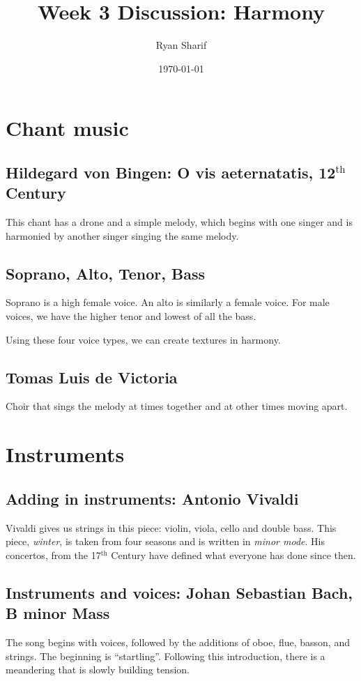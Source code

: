 \documentclass[letter,twoside,twocolumn]{article}
\author{Ryan Sharif}
\date{\today}
\title{Week 3 Discussion: Harmony}
\begin{document}
\maketitle

\section{Chant music}
\label{sec-1}
\subsection{Hildegard von Bingen: O vis aeternatatis, 12$^{\text{th}}$ Century}
\label{sec-1-1}

This chant has a drone and a simple melody, which begins with one
singer and is harmonied by another singer singing the same melody.

\subsection{Soprano, Alto, Tenor, Bass}
\label{sec-1-2}
Soprano is a high female voice. An alto is similarly a female voice.
For male voices, we have the higher tenor and lowest of all the bass.

Using these four voice types, we can create textures in harmony.

\subsection{Tomas Luis de Victoria}
\label{sec-1-3}
Choir that sings the melody at times together and at other times
moving apart.

\section{Instruments}
\label{sec-2}
\subsection{Adding in instruments: Antonio Vivaldi}
\label{sec-2-1}
Vivaldi gives us strings in this piece: violin, viola, cello and
double bass. This piece, \emph{winter}, is taken from four seasons and
is written in \emph{minor mode}. His concertos, from the 17$^{\text{th}}$ Century
 have defined what everyone has done since then.
\subsection{Instruments and voices: Johan Sebastian Bach, B minor Mass}
\label{sec-2-2}
The song begins with voices, followed by the additions of
oboe, flue, basson, and strings. The beginning is ``startling''.
Following this introduction, there is a meandering that is slowly
building tension.
\end{document}
